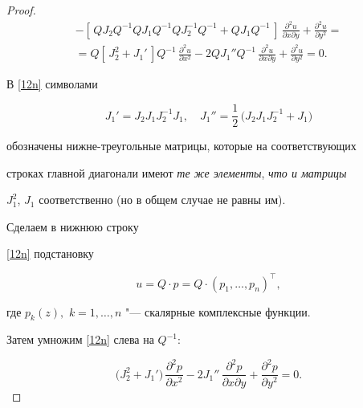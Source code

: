 \begin{proof}
\begin{multline}
-\left[\,QJ_2Q^{-1}QJ_1Q^{-1}QJ_2^{-1}Q^{-1}+QJ_1Q^{-1}\,\right]

\,\frac{\partial^2 u}{\partial x\partial y}

 +\frac{\partial^2 u}{\partial y^2}=

\\

 =Q\left[\,J_2^2+J_1'\,\right]Q^{-1}\,\frac{\partial^2 u}{\partial x^2}-

2QJ_1''Q^{-1}\,\frac{\partial^2 u}{\partial x\partial y}

 +\frac{\partial^2 u}{\partial y^2}=0.

 \label{12n}

 \end{multline}



В \eqref{12n} символами

$$

J_1'=J_2J_1J_2^{-1}J_1,\quad

J_1''=\frac{1}{2}\,\bigr(J_2J_1J_2^{-1}+J_1\bigr)

$$

 обозначены нижне-треугольные матрицы,  которые  на соответствующих

строках главной диагонали имеют {\it те же элементы}, {\it что и матрицы}

$J_1^2$, $J_1$ соответственно (но в общем случае не равны им).



Сделаем в нижнюю строку

 \eqref{12n} подстановку

 \begin{equation}

 u=Q\cdot p=Q\cdot(p_1,\ldots,p_n)^\top,

 \label{13n}

 \end{equation}

 где $p_k(z),$ $k=1,\ldots,n $ "---   скалярные комплексные функции. 

 Затем    умножим \eqref{12n} слева на $Q^{-1}$:

\begin{equation}

\bigr(J_2^2+J_1'\bigr)\,\frac{\partial^2 p}{\partial x^2}-

2J_1''\,\frac{\partial^2 p}{\partial x\partial y}+

\frac{\partial^2 p}{\partial y^2}=0.

\label{14n}


\end{equation}
\end{proof}
